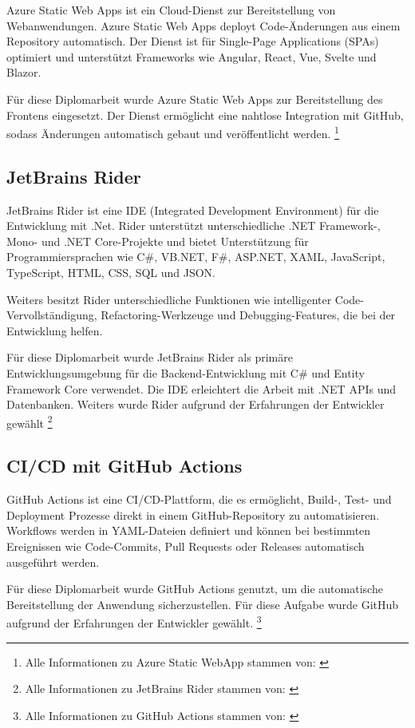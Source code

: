 Azure Static Web Apps ist ein Cloud-Dienst zur Bereitstellung von Webanwendungen. 
Azure Static Web Apps deployt Code-Änderungen aus einem Repository automatisch. Der Dienst 
ist für Single-Page Applications (SPAs) optimiert und unterstützt Frameworks wie Angular, 
React, Vue, Svelte und Blazor.

Für diese Diplomarbeit wurde Azure Static Web Apps zur Bereitstellung des Frontens 
eingesetzt. Der Dienst ermöglicht eine nahtlose Integration mit GitHub, sodass Änderungen 
automatisch gebaut und veröffentlicht werden.
\footnote{Alle Informationen zu Azure Static WebApp stammen von: \cite{MicrosoftCorporationz}}

\subsection{JetBrains Rider}
\label{subsection:jetbrains-rider}

JetBrains Rider ist eine IDE (Integrated Development Environment) für die Entwicklung mit .Net. 
Rider unterstützt unterschiedliche .NET Framework-, Mono- und .NET Core-Projekte und bietet 
Unterstützung für Programmiersprachen wie C\#, VB.NET, F\#, ASP.NET, XAML, JavaScript, 
TypeScript, HTML, CSS, SQL und JSON.

Weiters besitzt Rider unterschiedliche Funktionen wie intelligenter Code-Vervollständigung, 
Refactoring-Werkzeuge und Debugging-Features, die bei der Entwicklung helfen. 

Für diese Diplomarbeit wurde JetBrains Rider als primäre Entwicklungsumgebung für die 
Backend-Entwicklung mit C\# und Entity Framework Core verwendet. Die IDE erleichtert 
die Arbeit mit .NET APIs und Datenbanken. Weiters wurde Rider aufgrund der 
Erfahrungen der Entwickler gewählt
\footnote{Alle Informationen zu JetBrains Rider stammen von: \cite{JetBrains}}

\subsection{CI/CD mit GitHub Actions}

GitHub Actions ist eine CI/CD-Plattform, die es ermöglicht, Build-, Test- und 
Deployment Prozesse direkt in einem GitHub-Repository zu automatisieren. Workflows 
werden in YAML-Dateien definiert und können bei bestimmten Ereignissen wie 
Code-Commits, Pull Requests oder Releases automatisch ausgeführt werden.

Für diese Diplomarbeit wurde GitHub Actions genutzt, um die automatische Bereitstellung 
der Anwendung sicherzustellen. Für diese Aufgabe wurde GitHub aufgrund der Erfahrungen
der Entwickler gewählt.
\footnote{Alle Informationen zu GitHub Actions stammen von: \cite{GitHuba}}


